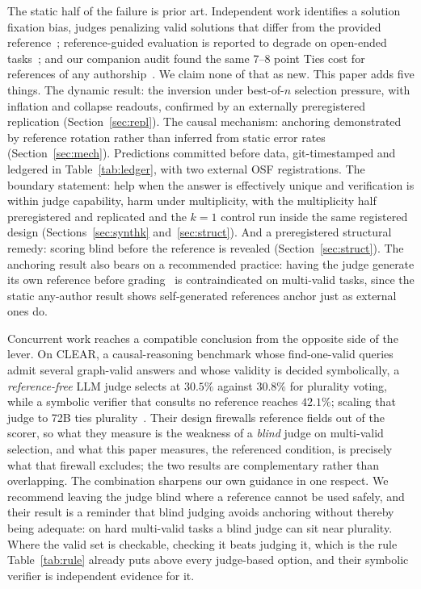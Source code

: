\documentclass[11pt]{article}
\begin{document}
The static half of the failure is prior art.
Independent work identifies a solution fixation bias, judges penalizing valid solutions that differ from the provided reference~\cite{fixation2025}; reference-guided evaluation is reported to degrade on open-ended tasks~\cite{judgingref2026}; and our companion audit found the same $7$--$8$ point Ties cost for references of any authorship~\cite{companionA}.
We claim none of that as new.
This paper adds five things.
The dynamic result: the inversion under best-of-$n$ selection pressure, with inflation and collapse readouts, confirmed by an externally preregistered replication (Section~\ref{sec:repl}).
The causal mechanism: anchoring demonstrated by reference rotation rather than inferred from static error rates (Section~\ref{sec:mech}).
Predictions committed before data, git-timestamped and ledgered in Table~\ref{tab:ledger}, with two external OSF registrations.
The boundary statement: help when the answer is effectively unique and verification is within judge capability, harm under multiplicity, with the multiplicity half preregistered and replicated and the $k{=}1$ control run inside the same registered design (Sections~\ref{sec:synthk} and~\ref{sec:struct}).
And a preregistered structural remedy: scoring blind before the reference is revealed (Section~\ref{sec:struct}).
The anchoring result also bears on a recommended practice: having the judge generate its own reference before grading~\cite{dobefore2025} is contraindicated on multi-valid tasks, since the static any-author result shows self-generated references anchor just as external ones do.

Concurrent work reaches a compatible conclusion from the opposite side of the lever.
On \textsc{CLEAR}, a causal-reasoning benchmark whose find-one-valid queries admit several graph-valid answers and whose validity is decided symbolically, a \emph{reference-free} LLM judge selects at $30.5\%$ against $30.8\%$ for plurality voting, while a symbolic verifier that consults no reference reaches $42.1\%$; scaling that judge to 72B ties plurality~\cite{calver2026}.
Their design firewalls reference fields out of the scorer, so what they measure is the weakness of a \emph{blind} judge on multi-valid selection, and what this paper measures, the referenced condition, is precisely what that firewall excludes; the two results are complementary rather than overlapping.
The combination sharpens our own guidance in one respect.
We recommend leaving the judge blind where a reference cannot be used safely, and their result is a reminder that blind judging avoids anchoring without thereby being adequate: on hard multi-valid tasks a blind judge can sit near plurality.
Where the valid set is checkable, checking it beats judging it, which is the rule Table~\ref{tab:rule} already puts above every judge-based option, and their symbolic verifier is independent evidence for it.
\end{document}
